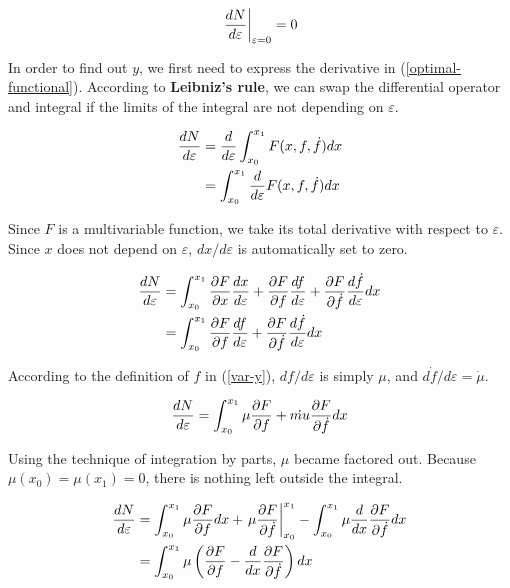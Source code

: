 \documentclass{article}
\begin{document}
\begin{equation}
	\left.dN\over d\varepsilon\right|_{\varepsilon=0}=0
	\label{optimal-functional}
\end{equation}

In order to find out $y$, we first need to express the derivative in
(\ref{optimal-functional}). According to \textbf{Leibniz's rule}, we can swap
the differential operator and integral if the limits of the integral are
not depending on $\varepsilon$.

$$
\begin{aligned}
	{dN\over d\varepsilon}
	&={d\over d\varepsilon}\int_{x_0}^{x_1}F(x,f,\dot{f})dx \\
	&=\int_{x_0}^{x_1}{d\over d\varepsilon}F(x,f,\dot{f})dx
\end{aligned}
$$

Since $F$ is a multivariable function, we take its total derivative with
respect to $\varepsilon$. Since $x$ does not depend on $\varepsilon$,
$dx/d\varepsilon$ is automatically set to zero.

$$
\begin{aligned}
	{dN\over d\varepsilon}
	&=\int_{x_0}^{x_1}{\partial F\over\partial x}
	{dx\over d\varepsilon}+{\partial F\over\partial f}
	{df\over d\varepsilon}+{\partial F\over\partial\dot{f}}
	{d\dot{f}\over d\varepsilon}dx \\
	&=\int_{x_0}^{x_1}{\partial F\over\partial f}{df\over d\varepsilon}
	+{\partial F\over\partial\dot{f}}{d\dot{f}\over d\varepsilon}dx
\end{aligned}
$$

According to the definition of $f$ in (\ref{var-y}), $df/d\varepsilon$ is
simply $\mu$, and $d\dot{f}/d\varepsilon=\dot{\mu}$.

$$
{dN\over d\varepsilon}=\int_{x_0}^{x_1}\mu{\partial F\over\partial f}
+\dot{mu}{\partial F\over\partial\dot{f}}dx
$$

Using the technique of integration by parts, $\mu$ became factored out. Because
$\mu(x_0)=\mu(x_1)=0$, there is nothing left outside the integral.

$$
\begin{aligned}
	{dN\over d\varepsilon}
	&=\int_{x_0}^{x_1}\mu{\partial F\over\partial f}dx+
	\left.\mu{\partial F\over\partial\dot{f}}\right|_{x_0}^{x_1}
	-\int_{x_0}^{x_1}\mu{d\over dx}{\partial F\over\partial\dot{f}}dx \\
	&=\int_{x_0}^{x_1}\mu\left({\partial F\over\partial f}-
	{d\over dx}{\partial F\over\partial\dot{f}}\right)dx
\end{aligned}
$$
\end{document}
